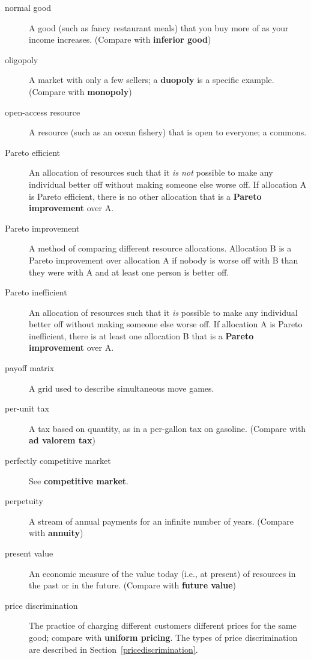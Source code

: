 \begin{description}
\item[normal good] A good (such as fancy restaurant meals) that you buy more of as your income increases. (Compare with \textbf{inferior good})

\item[oligopoly] A market with only a few sellers; a \textbf{duopoly} is a specific example. (Compare with \textbf{monopoly})

\item[open-access resource] A resource (such as an ocean fishery) that is open to everyone; a commons.

\item[Pareto efficient] An allocation of resources such that it \emph{is not} possible to make any individual better off without making someone else worse off. If allocation A is Pareto efficient, there is no other allocation that is a \textbf{Pareto improvement} over A.

\item[Pareto improvement] A method of comparing different resource allocations. Allocation B is a Pareto improvement over allocation A if nobody is worse off with B than they were with A and at least one person is better off.

\item[Pareto inefficient] An allocation of resources such that it \emph{is} possible to make any individual better off without making someone else worse off. If allocation A is Pareto inefficient, there is at least one allocation B that is a \textbf{Pareto improvement} over A.

\item[payoff matrix] A grid used to describe simultaneous move games. 

\item[per-unit tax] A tax based on quantity, as in a per-gallon tax on gasoline. (Compare with \textbf{ad valorem tax})

\item[perfectly competitive market] See \textbf{competitive market}. 

\item[perpetuity] A stream of annual payments for an infinite number of years. (Compare with \textbf{annuity})

\item[present value] An economic measure of the value today (i.e., at present) of resources in the past or in the future. (Compare with \textbf{future value})

\item[price discrimination] The practice of charging different customers different prices for the same good; compare with \textbf{uniform pricing}. The types of price discrimination are described in Section~\ref{pricediscrimination}.%


\end{description}
